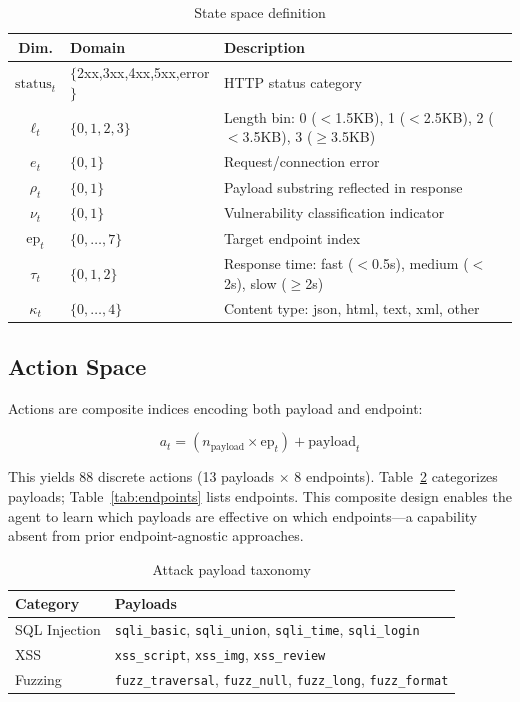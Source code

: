 \documentclass[5p,twocolumn]{elsarticle}
\begin{document}
\begin{table}[t]
\caption{State space definition}
\centering
\label{tab:state}
\begin{tabular}{clp{5cm}}
\toprule
Dim. & Domain & Description \\
\midrule
$\text{status}_t$ & $\{$2xx,3xx,4xx,5xx,error$\}$ & HTTP status category \\
$\ell_t$ & $\{0,1,2,3\}$ & Length bin: 0 ($<$1.5KB), 1 ($<$2.5KB), 2 ($<$3.5KB), 3 ($\ge$3.5KB) \\
$e_t$ & $\{0,1\}$ & Request/connection error \\
$\rho_t$ & $\{0,1\}$ & Payload substring reflected in response \\
$\nu_t$ & $\{0,1\}$ & Vulnerability classification indicator \\
$\text{ep}_t$ & $\{0,\dots,7\}$ & Target endpoint index \\
$\tau_t$ & $\{0,1,2\}$ & Response time: fast ($<$0.5s), medium ($<$2s), slow ($\ge$2s) \\
$\kappa_t$ & $\{0,\dots,4\}$ & Content type: json, html, text, xml, other \\
\bottomrule
\end{tabular}
\end{table}

\subsection{Action Space}

Actions are composite indices encoding both payload and endpoint:

\begin{equation}
a_t = (n_{\text{payload}} \times \text{ep}_t) + \text{payload}_t
\end{equation}

This yields 88 discrete actions (13 payloads $\times$ 8 endpoints). Table~\ref{tab:payloads} categorizes payloads; Table~\ref{tab:endpoints} lists endpoints. This composite design enables the agent to learn which payloads are effective on which endpoints---a capability absent from prior endpoint-agnostic approaches.

\begin{table}[t]
\caption{Attack payload taxonomy}
\centering
\label{tab:payloads}
\begin{tabular}{ll}
\toprule
Category & Payloads \\
\midrule
SQL Injection & \texttt{sqli\_basic}, \texttt{sqli\_union}, \texttt{sqli\_time}, \texttt{sqli\_login} \\
XSS & \texttt{xss\_script}, \texttt{xss\_img}, \texttt{xss\_review} \\
Fuzzing & \texttt{fuzz\_traversal}, \texttt{fuzz\_null}, \texttt{fuzz\_long}, \texttt{fuzz\_format} \\
\bottomrule
\end{tabular}
\end{table}
\end{document}
